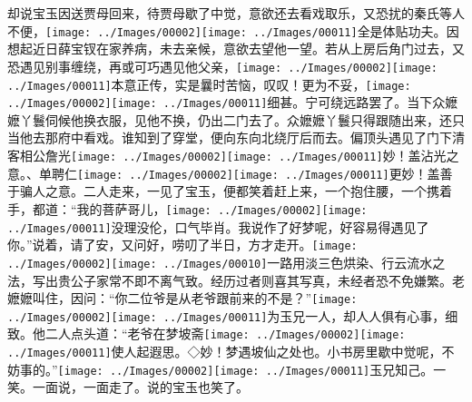 却说宝玉因送贾母回来，待贾母歇了中觉，意欲还去看戏取乐，又恐扰的秦氏等人不便，{\texttt{[image: ../Images/00002]}\texttt{[image: ../Images/00011]}\footnotesize \kaishu 全是体贴功夫。}因想起近日薛宝钗在家养病，未去亲候，意欲去望他一望。若从上房后角门过去，又恐遇见别事缠绕，再或可巧遇见他父亲，{\texttt{[image: ../Images/00002]}\texttt{[image: ../Images/00011]}\footnotesize \kaishu 本意正传，实是曩时苦恼，叹叹！}更为不妥，{\texttt{[image: ../Images/00002]}\texttt{[image: ../Images/00011]}\footnotesize \kaishu 细甚。}宁可绕远路罢了。当下众嬷嬷丫鬟伺候他换衣服，见他不换，仍出二门去了。众嬷嬷丫鬟只得跟随出来，还只当他去那府中看戏。谁知到了穿堂，便向东向北绕厅后而去。偏顶头遇见了门下清客相公詹光{\texttt{[image: ../Images/00002]}\texttt{[image: ../Images/00011]}\footnotesize \kaishu 妙！盖沾光之意。}、单聘仁{\texttt{[image: ../Images/00002]}\texttt{[image: ../Images/00011]}\footnotesize \kaishu 更妙！盖善于骗人之意。}二人走来，一见了宝玉，便都笑着赶上来，一个抱住腰，一个携着手，都道：``我的菩萨哥儿，{\texttt{[image: ../Images/00002]}\texttt{[image: ../Images/00011]}\footnotesize \kaishu 没理没伦，口气毕肖。}我说作了好梦呢，好容易得遇见了你。''说着，请了安，又问好，唠叨了半日，方才走开。{\texttt{[image: ../Images/00002]}\texttt{[image: ../Images/00010]}\footnotesize \kaishu 一路用淡三色烘染、行云流水之法，写出贵公子家常不即不离气致。经历过者则喜其写真，未经者恐不免嫌繁。}老嬷嬷叫住，因问：``你二位爷是从老爷跟前来的不是？''{\texttt{[image: ../Images/00002]}\texttt{[image: ../Images/00011]}\footnotesize \kaishu 为玉兄一人，却人人俱有心事，细致。}他二人点头道：``老爷在梦坡斋{\texttt{[image: ../Images/00002]}\texttt{[image: ../Images/00011]}\footnotesize \kaishu 使人起遐思。◇妙！梦遇坡仙之处也。}小书房里歇中觉呢，不妨事的。''{\texttt{[image: ../Images/00002]}\texttt{[image: ../Images/00011]}\footnotesize \kaishu 玉兄知己。一笑。}一面说，一面走了。说的宝玉也笑了。

